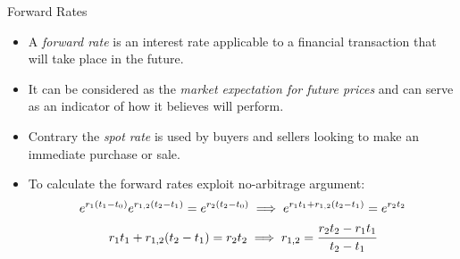 \documentclass{beamer}
\begin{document}
%

\begin{frame}{Forward Rates}
  \begin{itemize}
  \item A \emph{forward rate} is an interest rate applicable to a financial transaction that will take place in the future.
  \item It can be considered as the \emph{market expectation for future prices} and can serve as an indicator of how it believes will perform.
  \item Contrary the \emph{spot rate} is used by buyers and sellers looking to make an immediate purchase or sale.
  \item To calculate the forward rates exploit no-arbitrage argument:
    \begin{equation}
      \begin{gathered}
        e^{r_1 (t_1-t_0)}e^{r_{1,2}(t_2 - t_1)} = e^{r_2 (t_2-t_0)} \implies e^{r_1 t_1 + r_{1,2}(t_2 - t_1)} = e^{r_2 t_2} \\
        r_1 t_1 + r_{1,2}(t_2 - t_1) = r_2 t_2 \implies r_{1,2} = \cfrac{r_2 t_2 - r_1 t_1 }{t_2 - t_1}
      \end{gathered}
    \end{equation}
  \end{itemize}
\end{frame}
\end{document}
